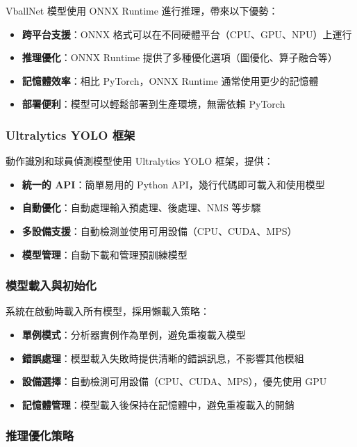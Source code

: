 \documentclass[a4paper,14pt,oneside]{article}
\begin{document}
VballNet 模型使用 ONNX Runtime 進行推理，帶來以下優勢：

\begin{itemize}
    \item \textbf{跨平台支援}：ONNX 格式可以在不同硬體平台（CPU、GPU、NPU）上運行
    \item \textbf{推理優化}：ONNX Runtime 提供了多種優化選項（圖優化、算子融合等）
    \item \textbf{記憶體效率}：相比 PyTorch，ONNX Runtime 通常使用更少的記憶體
    \item \textbf{部署便利}：模型可以輕鬆部署到生產環境，無需依賴 PyTorch
\end{itemize}

\subsubsection{Ultralytics YOLO 框架}

動作識別和球員偵測模型使用 Ultralytics YOLO 框架，提供：

\begin{itemize}
    \item \textbf{統一的 API}：簡單易用的 Python API，幾行代碼即可載入和使用模型
    \item \textbf{自動優化}：自動處理輸入預處理、後處理、NMS 等步驟
    \item \textbf{多設備支援}：自動檢測並使用可用設備（CPU、CUDA、MPS）
    \item \textbf{模型管理}：自動下載和管理預訓練模型
\end{itemize}

\subsubsection{模型載入與初始化}

系統在啟動時載入所有模型，採用懶載入策略：

\begin{itemize}
    \item \textbf{單例模式}：分析器實例作為單例，避免重複載入模型
    \item \textbf{錯誤處理}：模型載入失敗時提供清晰的錯誤訊息，不影響其他模組
    \item \textbf{設備選擇}：自動檢測可用設備（CPU、CUDA、MPS），優先使用 GPU
    \item \textbf{記憶體管理}：模型載入後保持在記憶體中，避免重複載入的開銷
\end{itemize}

\subsubsection{推理優化策略}
\end{document}
